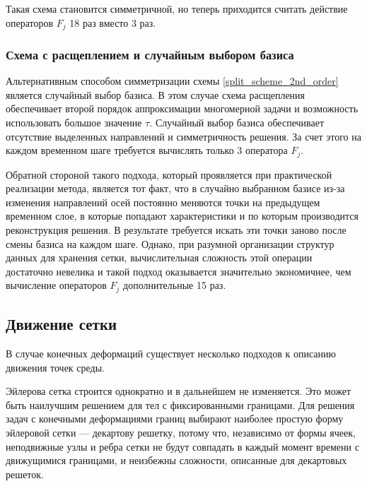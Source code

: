 Такая схема становится симметричной, но теперь приходится считать действие операторов $F_j$ 18 раз вместо 3 раз.


\subsubsection{Схема с расщеплением и случайным выбором базиса}

Альтернативным способом симметризации схемы \ref{split_scheme_2nd_order} является случайный выбор базиса. В этом случае схема расщепления обеспечивает второй порядок аппроксимации многомерной задачи и возможность использовать большое значение $\tau$. Случайный выбор базиса обеспечивает отсутствие выделенных направлений и симметричность решения. За счет этого на каждом временном шаге требуется вычислять только 3 оператора $F_j$.

Обратной стороной такого подхода, который проявляется при практической реализации метода, является тот факт, что в случайно выбранном базисе из-за изменения направлений осей постоянно меняются точки на предыдущем временном слое, в которые попадают характеристики и по которым производится реконструкция решения. В результате требуется искать эти точки заново после смены базиса на каждом шаге. Однако, при разумной организации структур данных для хранения сетки, вычислительная сложность этой операции достаточно невелика и такой подход оказывается значительно экономичнее, чем вычисление операторов $F_j$ дополнительные 15 раз.


\subsection{Движение сетки}


В случае конечных деформаций существует несколько подходов к описанию движения точек среды.

Эйлерова сетка строится однократно и в дальнейшем не изменяется. Это может быть наилучшим решением для тел с фиксированными границами. Для решения задач с конечными деформациями границ выбирают наиболее простую форму эйлеровой сетки — декартову решетку, потому что, независимо от формы ячеек, неподвижные узлы и ребра сетки не будут совпадать в каждый момент времени с движущимися границами, и неизбежны сложности, описанные для декартовых решеток.

